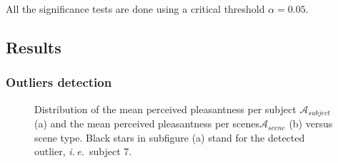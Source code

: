 \documentclass[12pt]{elsarticle}
\newcommand{\ie}{\emph{i.\,e.}}
\newcommand{\cf}{cf.}
\newcommand{\myfloatalign}{\centering}
\begin{document}

All the significance tests are done using a critical threshold $\alpha=0.05$.

\subsection{Results}

\subsubsection{Outliers detection}

\begin{figure}[t]
        \myfloatalign
        \caption{Distribution of the mean perceived pleasantness per subject $\mathcal{A}_{subject}$ (a) and the mean perceived pleasantness  per scenes$\mathcal{A}_{scene}$ (b) versus scene type. Black stars in subfigure (a) stand for the detected outlier, \ie~subject 7.}\label{fig:xp2A}
\end{figure}

\end{document}
